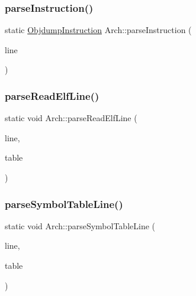 \mbox{\label{classArch_a15814eafabeb6142fa46098767617d83}} 
\subsubsection{\texorpdfstring{parse\+Instruction()}{parseInstruction()}}
{\footnotesize\ttfamily static \hyperlink{classObjdumpInstruction}{Objdump\+Instruction} Arch\+::parse\+Instruction (\begin{DoxyParamCaption}\item[{const string \&}]{line }\end{DoxyParamCaption})\hspace{0.3cm}{\ttfamily [static]}}

\mbox{\label{classArch_a76f94b5b6ae95117c9f50eb239c8b1f6}} 
\subsubsection{\texorpdfstring{parse\+Read\+Elf\+Line()}{parseReadElfLine()}}
{\footnotesize\ttfamily static void Arch\+::parse\+Read\+Elf\+Line (\begin{DoxyParamCaption}\item[{const string \&}]{line,  }\item[{\hyperlink{classObjdumpSymbolTable}{Objdump\+Symbol\+Table} \&}]{table }\end{DoxyParamCaption})\hspace{0.3cm}{\ttfamily [static]}}

\mbox{\label{classArch_a37495eac849d7f1e895656c67f28048c}} 
\subsubsection{\texorpdfstring{parse\+Symbol\+Table\+Line()}{parseSymbolTableLine()}}
{\footnotesize\ttfamily static void Arch\+::parse\+Symbol\+Table\+Line (\begin{DoxyParamCaption}\item[{const string \&}]{line,  }\item[{\hyperlink{classObjdumpSymbolTable}{Objdump\+Symbol\+Table} \&}]{table }\end{DoxyParamCaption})\hspace{0.3cm}{\ttfamily [static]}}


